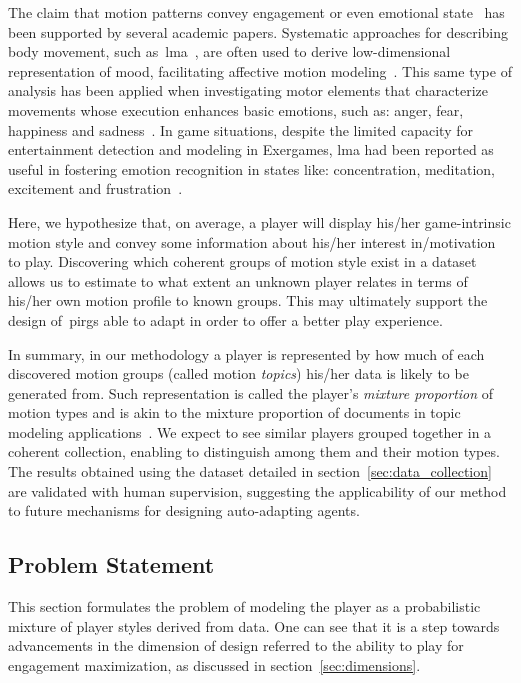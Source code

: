 The claim that motion patterns convey engagement or even emotional state~\citep{aristidou_emotion_2015,shafir_emotion_2016,tsachor_somatic_2017} has been supported by several academic papers. Systematic approaches for describing body movement, such as~\gls{lma}~\citep{laban_language_1974}, are often used to derive low-dimensional representation of mood, facilitating affective motion modeling~\citep{burton_laban_2016}. This same type of analysis has been applied when investigating motor elements that characterize movements whose execution enhances basic emotions, such as: anger, fear, happiness and sadness~\citep{shafir_emotion_2016}. In game situations, despite the limited capacity for entertainment detection and modeling in Exergames, \gls{lma} had been reported as useful in fostering emotion recognition in states like: concentration, meditation, excitement and frustration~\citep{zacharatos_emotion_2013}.

Here, we hypothesize that, on average, a player will display his/her game-intrinsic motion style and convey some information about his/her interest in/motivation to play. Discovering which coherent groups of motion style exist in a dataset allows us to estimate to what extent an unknown player relates in terms of his/her own motion profile to known groups. This may ultimately support the design of~\gls{pirg}s able to adapt in order to offer a better play experience.

In summary, in our methodology a player is represented by how much of each discovered motion groups (called motion \textit{topics}) his/her data is likely to be generated from. Such representation is called the player's \textit{mixture proportion} of motion types and is akin to the mixture proportion of documents in topic modeling applications~\citep{blei_latent_2003}. We expect to see similar players grouped together in a coherent collection, enabling to distinguish among them and their motion types. The results obtained using the dataset detailed in section~\ref{sec:data_collection} are validated with human supervision, suggesting the applicability of our method to future mechanisms for designing auto-adapting agents.

\subsection{Problem Statement}
This section formulates the problem of modeling the player as a probabilistic mixture of player styles derived from data. One can see that it is a step towards advancements in the dimension of design referred to the ability to play for engagement maximization, as discussed in section~\ref{sec:dimensions}.

